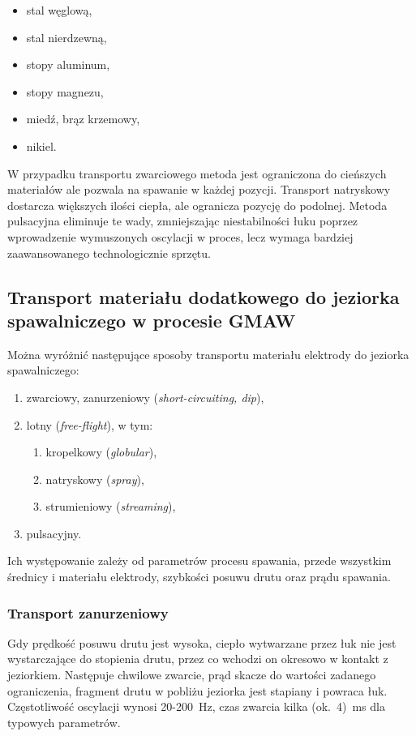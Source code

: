 \documentclass{mwart}
\begin{document}
\begin{itemize}
    \item stal węglową,
    \item stal nierdzewną,
    \item stopy aluminum,
    \item stopy magnezu,
    \item miedź, brąz krzemowy,
    \item nikiel.
\end{itemize}
W przypadku transportu zwarciowego metoda jest ograniczona do cieńszych materiałów ale pozwala na spawanie w każdej pozycji. Transport natryskowy dostarcza większych ilości ciepła, ale ogranicza pozycję do podolnej. Metoda pulsacyjna eliminuje te wady, zmniejszając niestabilności łuku poprzez wprowadzenie wymuszonych oscylacji w proces, lecz wymaga bardziej zaawansowanego technologicznie sprzętu.    

\subsection{Transport materiału dodatkowego do jeziorka spawalniczego w procesie GMAW}
Można wyróżnić następujące sposoby transportu materiału elektrody do jeziorka spawalniczego\cite{naidu_modeling_2003,norrish_gas_2006, mizerski_spawanie_2013}:

\begin{enumerate}
    \item zwarciowy, zanurzeniowy (\emph{short-circuiting, dip}),
    \item lotny (\emph{free-flight}), w tym:
    \begin{enumerate}
        \item kropelkowy (\emph{globular}),
        \item natryskowy (\emph{spray}),
        \item strumieniowy (\emph{streaming}),
    \end{enumerate}
    \item pulsacyjny.
\end{enumerate}

Ich występowanie zależy od parametrów procesu spawania, przede wszystkim średnicy i materiału elektrody, szybkości posuwu drutu oraz prądu spawania. \cite{nadzam_gas_2014}

    \subsubsection{Transport zanurzeniowy}
    Gdy prędkość posuwu drutu jest wysoka, ciepło wytwarzane przez łuk nie jest wystarczające do stopienia drutu, przez co wchodzi on okresowo w kontakt z jeziorkiem. Następuje chwilowe zwarcie, prąd skacze do wartości zadanego ograniczenia, fragment drutu w pobliżu jeziorka jest stapiany i powraca łuk. Częstotliwość oscylacji wynosi 20-200~Hz, czas zwarcia kilka (ok.~4)~ms dla typowych parametrów.
    
\end{document}
